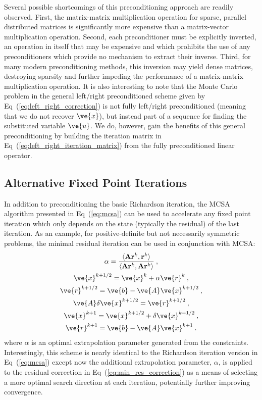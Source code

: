 \documentclass[letterpaper,11pt]{article}
\begin{document}
Several possible shortcomings of this preconditioning approach are
readily observed. First, the matrix-matrix multiplication operation
for sparse, parallel distributed matrices is significantly more
expensive than a matrix-vector multiplication operation. Second, each
preconditioner must be explicitly inverted, an operation in itself
that may be expensive and which prohibits the use of any
preconditioners which provide no mechanism to extract their
inverse. Third, for many modern preconditioning methods, this
inversion may yield dense matrices, destroying sparsity and further
impeding the performance of a matrix-matrix multiplication
operation. It is also interesting to note that the Monte Carlo problem
in the general left/right preconditioned scheme given by
Eq~(\ref{eq:left_right_correction}) is not fully left/right
preconditioned (meaning that we do not recover $\ve{x}$), but instead
part of a sequence for finding the substituted variable $\ve{u}$. We
do, however, gain the benefits of this general preconditioning by
building the iteration matrix in
Eq~(\ref{eq:left_right_iteration_matrix}) from the fully
preconditioned linear operator.

\subsection{Alternative Fixed Point Iterations}
\label{subsubsec:alternative_fixed_point}
In addition to preconditioning the basic Richardson iteration, the
MCSA algorithm presented in Eq~(\ref{eq:mcsa}) can be used to
accelerate any fixed point iteration which only depends on the state
(typically the residual) of the last iteration. As an example, for
positive-definite but not necessarily symmetric problems, the minimal
residual iteration \cite{saad_iterative_2003} can be used in
conjunction with MCSA:
\begin{subequations}
  \begin{gather}
    \alpha = \frac{\langle \mathbf{A}\mathbf{r}^k, \mathbf{r}^k
      \rangle}{\langle \mathbf{A}\mathbf{r}^k, \mathbf{A}\mathbf{r}^k
      \rangle}\:, \\
    \ve{x}^{k+1/2} = \ve{x}^k + \alpha \ve{r}^k\:,
    \label{eq:min_res_correction}\\
    \ve{r}^{k+1/2} = \ve{b} - \ve{A}\ve{x}^{k+1/2}\:,\\ 
    \ve{A}\delta\ve{x}^{k+1/2} = \ve{r}^{k+1/2}\:,\\ 
    \ve{x}^{k+1} = \ve{x}^{k+1/2} + \delta\ve{x}^{k+1/2}\:,\\ 
    \ve{r}^{k+1} = \ve{b} - \ve{A}\ve{x}^{k+1}\:.
  \end{gather}
  \label{eq:mcsa_min_res}
\end{subequations}
where $\alpha$ is an optimal extrapolation parameter generated from
the constraints. Interestingly, this scheme is nearly identical to the
Richardson iteration version in Eq~(\ref{eq:mcsa}) except now the
additional extrapolation parameter, $\alpha$, is applied to the
residual correction in Eq~(\ref{eq:min_res_correction}) as a means of
selecting a more optimal search direction at each iteration,
potentially further improving convergence.
\end{document}
